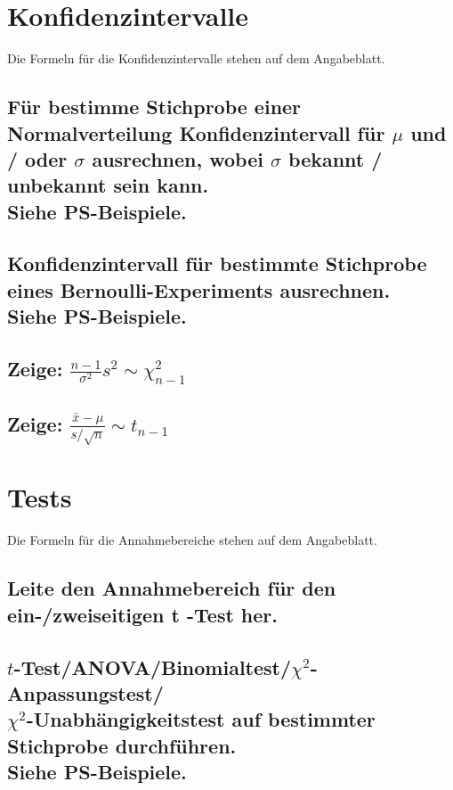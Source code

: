 \documentclass[a4paper,10pt]{article}
\begin{document}
\newpage
\section{Konfidenzintervalle}
Die Formeln für die Konfidenzintervalle stehen auf dem Angabeblatt.

\subsection{Für be\-stimme Stich\-probe ein\-er Normal\-ver\-teil\-ung Kon\-fi\-denz\-in\-ter\-vall für $\mu$ und / oder $\sigma$ aus\-rechnen, wo\-bei $\sigma$ be\-kannt / un\-be\-kannt sein kann. \\
Siehe PS-Bei\-spiele.}

\subsection{Konfidenz\-intervall für be\-stimmte Stich\-probe \\ eines Bern\-oulli-\-Ex\-peri\-ments ausrechnen. \\ Siehe PS-Bei\-spiele.}

\subsection{Zeige: $\frac{n-1}{\sigma^2} s^2 \sim \chi^{2}_{n-1}$}

\subsection{Zeige: $\frac{\bar{x} - \mu}{s/\sqrt{n}} \sim t_{n-1}$}

\newpage
\section{Tests}
Die Formeln für die Annahmebereiche stehen auf dem Angabeblatt.

\subsection{Leite den Annahmebereich für den ein-/zweiseitigen t -Test her.}

\subsection{$t$-Test/ANOVA/Binomial\-test/$\chi^2$-Anpassungs\-test/\\$\chi^2$-Unabhängigkeits\-test auf bestimmter Stich\-probe durchführen. \\ Siehe PS-Beispiele.}
\end{document}
